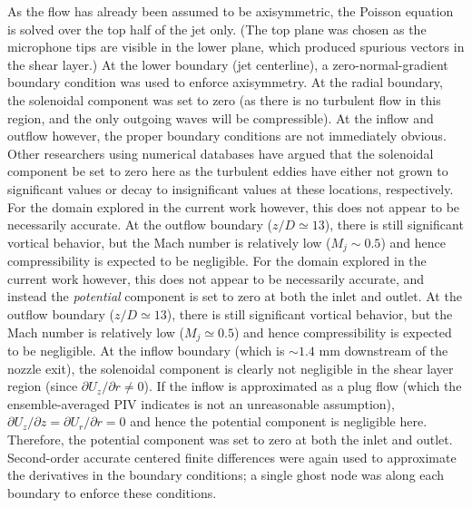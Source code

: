 As the flow has already been assumed to be axisymmetric, the Poisson equation is solved over the top half of the jet only.
(The top plane was chosen as the microphone tips are visible in the lower plane, which produced spurious vectors in the shear layer.)
At the lower boundary (jet centerline), a zero-normal-gradient boundary condition was used to enforce axisymmetry.
At the radial boundary, the solenoidal component was set to zero (as there is no turbulent flow in this region, and the only outgoing waves will be compressible).
At the inflow and outflow however, the proper boundary conditions are not immediately obvious.
Other researchers using numerical databases \citep{Unnikrishnan2015} have argued that the solenoidal component be set to zero here as the turbulent eddies have either not grown to significant values or decay to insignificant values at these locations, respectively.
For the domain explored in the current work however, this does not appear to be necessarily accurate.
At the outflow boundary ($z/D \simeq 13$), there is still significant vortical behavior, but the Mach number is relatively low ($M_j \sim 0.5$) and hence compressibility is expected to be negligible.
For the domain explored in the current work however, this does not appear to be necessarily accurate, and instead the \textit{potential} component is set to zero at both the inlet and outlet.
At the outflow boundary ($z/D \simeq 13$), there is still significant vortical behavior, but the Mach number is relatively low ($M_j \simeq 0.5$) and hence compressibility is expected to be negligible.
At the inflow boundary (which is $\sim1.4$ mm downstream of the nozzle exit), the solenoidal component is clearly not negligible in the shear layer region (since $\partial U_z / \partial r \neq 0$).
If the inflow is approximated as a plug flow (which the ensemble-averaged PIV indicates is not an unreasonable assumption), $\partial U_z / \partial z = \partial U_r / \partial r = 0$ and hence the potential component is negligible here.
Therefore, the potential component was set to zero at both the inlet and outlet.
Second-order accurate centered finite differences were again used to approximate the derivatives in the boundary conditions; a single ghost node was along each boundary to enforce these conditions.

